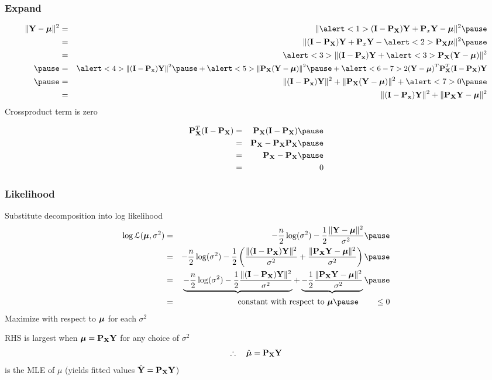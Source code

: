 \documentclass[handout]{beamer}
\begin{document}
\begin{frame}
  \frametitle{Expand}

  \begin{eqnarray*}
    \| \Y - \mub \|^2 & = & \|  \alert<1>{ (\I- \P_\X) \Y + \P_x \Y} -
    \mub \|^2 \pause \\
  & = & \| (\I - \P_\X) \Y + \P_x \Y - \alert<2>{\P_\X}\mub \|^2 \pause \\
  & = & \alert<3>{\|(\I -\P_\x)}\Y +  \alert<3>{\P_\X}(\Y  - \mub)
  \|^2 \\\pause
 & = & \alert<4>{\|(\I -\P_\x)\Y \|^2}\pause +  \alert<5>{\|
   {\P_\X}(\Y  - \mub) \|^2} \pause + \alert<6-7>{\small{2 (\Y -
\mub)^T \P_\X^T (\I - \P_\X) \Y }}\\ \pause
 & = & \|(\I -\P_\x)\Y \|^2 +  \| {\P_\X}(\Y  - \mub) \|^2 + \alert<7>{0} \pause
 \\
 & = & \|(\I -\P_\x)\Y \|^2 +  \| {\P_\X}\Y  - \mub \|^2
  \end{eqnarray*}  \pause
Crossproduct term is zero \pause

\begin{eqnarray*}
  \P_\X^T (\I - \P_\X) & = &  \P_\X (\I - \P_\X) \pause \\
  & = &  \P_\X - \P_\X\P_\X \pause \\
 & = &  \P_\X - \P_\X  \pause \\
& = & 0
\end{eqnarray*}
\end{frame}
\begin{frame}
  \frametitle{Likelihood}
Substitute decomposition into log likelihood
\begin{eqnarray*}
 \log \cL(\mub, \sigma^2)  & = &
-\frac{n}{2} \log(\sigma^2)
  - \frac 1 2 \frac{\| \Y - \mub \|^2}{\sigma^2} \pause \\
  & = & -\frac{n}{2} \log(\sigma^2)  - \frac 1 2 \left( \frac{\|(\I - \P_\X)
  \Y \|^2}{\sigma^2}
 + \frac{\| \P_\X \Y - \mub\|^2 } {\sigma^2} \right)  \pause \\
 & = &  \underbrace { -\frac{n}{2} \log(\sigma^2)  - \frac 1 2  \frac{\|(\I - \P_\X)
  \Y \|^2}{\sigma^2} }  +  \underbrace{- \frac 1 2  \frac{\| \P_\X \Y -
  \mub\|^2 } {\sigma^2}}  \pause \\
 & = &  \text{ constant with respect to } \mub \pause \qquad  \leq 0
\end{eqnarray*}   \pause
Maximize with respect to $\boldsymbol{\mu}$ for each $\sigma^2$ \pause

RHS is largest when $\boldsymbol{\mu} = \mathbf{P}_{\mathbf{X}} \mathbf{Y}$  for any choice of $\sigma^2$\pause
$$\therefore \quad \hat{\boldsymbol{\mu}} = \mathbf{P}_{\mathbf{X}} \mathbf{Y}$$
is the MLE of $\mu$ \pause (yields fitted values $\hat{\mathbf{Y}} = \mathbf{P}_{\mathbf{X}} \mathbf{Y}$)
\end{frame}
\end{document}
